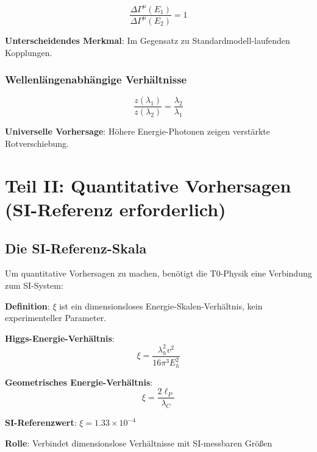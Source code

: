 \documentclass[12pt,a4paper]{article}
\newcommand{\xipar}{\xi}
\theoremstyle{definition}
\theoremstyle{remark}
\begin{document}
	\begin{equation}
		\boxed{\frac{\Delta\Gamma^{\mu}(E_1)}{\Delta\Gamma^{\mu}(E_2)} = 1}
		\label{eq:energy_independence_ratio}
	\end{equation}
	
	\textbf{Unterscheidendes Merkmal}: Im Gegensatz zu Standardmodell-laufenden Kopplungen.
	
	\subsubsection{Wellenlängenabhängige Verhältnisse}
	
	\begin{equation}
		\boxed{\frac{z(\lambda_1)}{z(\lambda_2)} = \frac{\lambda_2}{\lambda_1}}
		\label{eq:wavelength_ratio}
	\end{equation}
	
	\textbf{Universelle Vorhersage}: Höhere Energie-Photonen zeigen verstärkte Rotverschiebung.
	
	\section{Teil II: Quantitative Vorhersagen (SI-Referenz erforderlich)}
	
	\subsection{Die SI-Referenz-Skala}
	
	Um quantitative Vorhersagen zu machen, benötigt die T0-Physik eine Verbindung zum SI-System:
	
	\begin{tcolorbox}[colback=green!5!white,colframe=green!75!black,title=SI-Referenz-Skala (Kein Parameter!)]
		\textbf{Definition}: $\xipar$ ist ein dimensionsloses Energie-Skalen-Verhältnis, kein experimenteller Parameter.
		
		\textbf{Higgs-Energie-Verhältnis}:
		\begin{equation}
			\xipar = \frac{\lambda_h^2 v^2}{16\pi^3 E_h^2}
		\end{equation}
		
		\textbf{Geometrisches Energie-Verhältnis}:
		\begin{equation}
			\xipar = \frac{2\ell_P}{\lambda_C}
		\end{equation}
		
		\textbf{SI-Referenzwert}: $\xipar = 1.33 \times 10^{-4}$
		
		\textbf{Rolle}: Verbindet dimensionslose Verhältnisse mit SI-messbaren Größen
	\end{tcolorbox}
	
\end{document}

